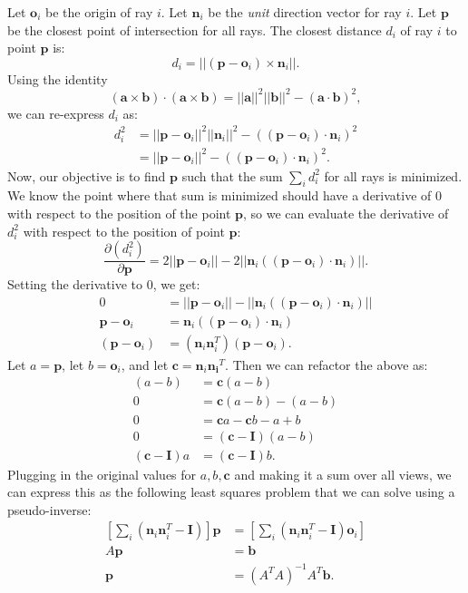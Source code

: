 \documentclass[11pt, letterpaper]{extarticle} %
\begin{document}
Let $\mathbf{o}_i$ be the origin of ray $i$. Let $\mathbf{n}_i$ be the \textit{unit} direction vector for ray $i$. Let $\mathbf{p}$ be the closest point of intersection for all rays. The closest distance $d_i$ of ray $i$ to point $\mathbf{p}$ is: 
\[
    d_i = ||(\mathbf{p}-\mathbf{o}_i) \times \mathbf{n}_i||.
\]
Using the identity
\[
(\mathbf{a} \times \mathbf{b})\cdot(\mathbf{a} \times \mathbf{b}) = ||\mathbf{a}||^2 ||\mathbf{b}||^2 - (\mathbf{a} \cdot \mathbf{b})^2,
\]
we can re-express $d_i$ as:
\begin{align*}
    d_i^2 &= ||\mathbf{p}-\mathbf{o}_i||^2 ||\mathbf{n}_i||^2 - \left((\mathbf{p}-\mathbf{o}_i) \cdot \mathbf{n}_i\right)^2 \\
          &= ||\mathbf{p}-\mathbf{o}_i||^2 - \left((\mathbf{p}-\mathbf{o}_i) \cdot \mathbf{n}_i\right)^2.
\end{align*}
Now, our objective is to find $\mathbf{p}$ such that the sum $\sum_i d_i^2$ for all rays is minimized. We know the point where that sum is minimized should have a derivative of $0$ with respect to the position of the point $\mathbf{p}$, so we can evaluate the derivative of $d_i^2$ with respect to the position of point $\mathbf{p}$:
\[
\frac{\partial (d_i^2)}{\partial \mathbf{p}} = 2 ||\mathbf{p} - \mathbf{o}_i|| - 2||\mathbf{n}_i \left( (\mathbf{p} - \mathbf{o}_i) \cdot \mathbf{n}_i \right)||.
\]
Setting the derivative to 0, we get:
\begin{align*}
    0 &= ||\mathbf{p} - \mathbf{o}_i|| - ||\mathbf{n}_i \left( (\mathbf{p} - \mathbf{o}_i) \cdot \mathbf{n}_i \right)|| \\
    \mathbf{p} - \mathbf{o}_i &= \mathbf{n}_i \left( (\mathbf{p} - \mathbf{o}_i) \cdot \mathbf{n}_i \right) \\
    (\mathbf{p} - \mathbf{o}_i) &= (\mathbf{n}_i \mathbf{n}_i^T)(\mathbf{p} - \mathbf{o}_i).
\end{align*}
Let $a = \mathbf{p}$, let $b = \mathbf{o}_i$, and let $\mathbf{c}  = \mathbf{n}_i \mathbf{n_i}^T$. Then we can refactor the above as:
\begin{align*}
    (a-b) &= \mathbf{c}(a-b) \\
    0 &= \mathbf{c}(a-b) - (a-b) \\
    0 &= \mathbf{c}a - \mathbf{c}b - a + b \\
    0 &= (\mathbf{c} - \mathbf{I}) (a - b) \\
    (\mathbf{c} - \mathbf{I})a &= (\mathbf{c} - \mathbf{I})b.
\end{align*}
Plugging in the original values for $a, b, \mathbf{c}$ and making it a sum over all views, we can express this as the following least squares problem that we can solve using a pseudo-inverse:
\begin{align}
    \left[ \sum_i \left(\mathbf{n}_i \mathbf{n}_i^T - \mathbf{I}\right) \right] \mathbf{p} &= \left[ \sum_i \left(\mathbf{n}_i \mathbf{n}_i^T - \mathbf{I}\right) \mathbf{o}_i \right] \\
    A \mathbf{p} &= \mathbf{b} \\
    \mathbf{p} &= (A^T A)^{-1}A^T \mathbf{b}.
\end{align}
\end{document}
